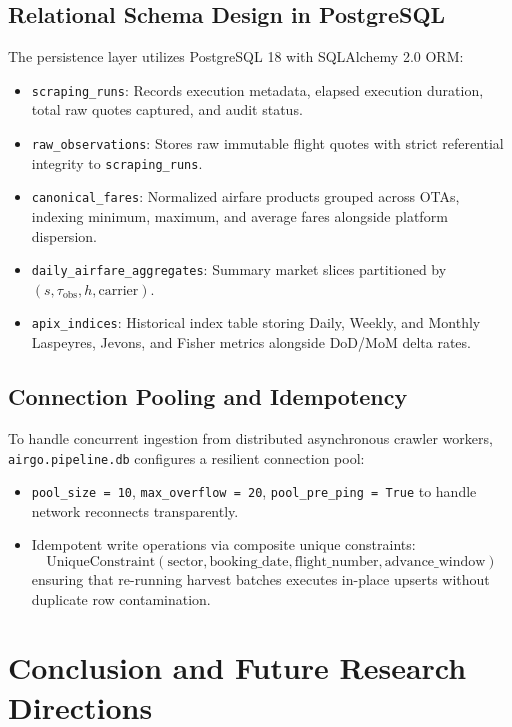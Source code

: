 \documentclass[11pt,a4paper]{article}
\begin{document}
\subsection{Relational Schema Design in PostgreSQL}
The persistence layer utilizes PostgreSQL 18 with SQLAlchemy 2.0 ORM:
\begin{itemize}
    \item \texttt{scraping\_runs}: Records execution metadata, elapsed execution duration, total raw quotes captured, and audit status.
    \item \texttt{raw_observations}: Stores raw immutable flight quotes with strict referential integrity to \texttt{scraping\_runs}.
    \item \texttt{canonical\_fares}: Normalized airfare products grouped across OTAs, indexing minimum, maximum, and average fares alongside platform dispersion.
    \item \texttt{daily\_airfare\_aggregates}: Summary market slices partitioned by $(s, \tau_{\text{obs}}, h, \text{carrier})$.
    \item \texttt{apix\_indices}: Historical index table storing Daily, Weekly, and Monthly Laspeyres, Jevons, and Fisher metrics alongside DoD/MoM delta rates.
\end{itemize}

\subsection{Connection Pooling and Idempotency}
To handle concurrent ingestion from distributed asynchronous crawler workers, \texttt{airgo.pipeline.db} configures a resilient connection pool:
\begin{itemize}
    \item \texttt{pool\_size = 10}, \texttt{max\_overflow = 20}, \texttt{pool\_pre\_ping = True} to handle network reconnects transparently.
    \item Idempotent write operations via composite unique constraints:
    \begin{equation}
    \text{UniqueConstraint}(\text{sector}, \text{booking\_date}, \text{flight\_number}, \text{advance\_window})
    \end{equation}
    ensuring that re-running harvest batches executes in-place upserts without duplicate row contamination.
\end{itemize}

\section{Conclusion and Future Research Directions}
\label{sec:conclusion}
\end{document}
